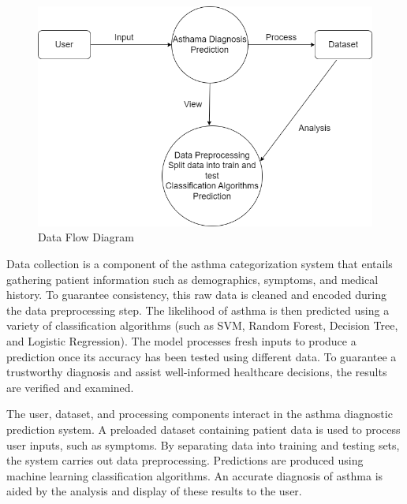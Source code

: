 \begin{figure}[h]
\centering
\includegraphics[width=0.7\linewidth]{Images/dd.png}
\caption{Data Flow Diagram}
\label{fig:enter-label}
\end{figure}
Data collection is a component of the asthma categorization system that entails gathering patient information such as demographics, symptoms, and medical history. To guarantee consistency, this raw data is cleaned and encoded during the data preprocessing step. The likelihood of asthma is then predicted using a variety of classification algorithms (such as SVM, Random Forest, Decision Tree, and Logistic Regression). The model processes fresh inputs to produce a prediction once its accuracy has been tested using different data. To guarantee a trustworthy diagnosis and assist well-informed healthcare decisions, the results are verified and examined.


The user, dataset, and processing components interact in the asthma diagnostic prediction system. A preloaded dataset containing patient data is used to process user inputs, such as symptoms. By separating data into training and testing sets, the system carries out data preprocessing. Predictions are produced using machine learning classification algorithms. An accurate diagnosis of asthma is aided by the analysis and display of these results to the user.
